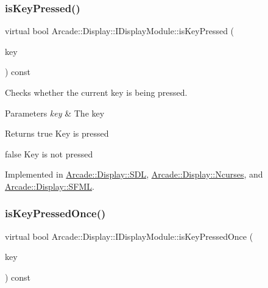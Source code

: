 \subsubsection{\texorpdfstring{isKeyPressed()}{isKeyPressed()}}
{\footnotesize\ttfamily virtual bool Arcade\+::\+Display\+::\+I\+Display\+Module\+::is\+Key\+Pressed (\begin{DoxyParamCaption}\item[{\mbox{\hyperlink{classArcade_1_1Display_1_1IDisplayModule_a8da3f6b309ca0581473ae8cc8789b619}{I\+Display\+Module\+::\+Keys}}}]{key }\end{DoxyParamCaption}) const\hspace{0.3cm}{\ttfamily [pure virtual]}}



Checks whether the current key is being pressed. 


\begin{DoxyParams}{Parameters}
{\em key} & The key \\
\hline
\end{DoxyParams}
\begin{DoxyReturn}{Returns}
true Key is pressed 

false Key is not pressed 
\end{DoxyReturn}


Implemented in \mbox{\hyperlink{classArcade_1_1Display_1_1SDL_ab7a692d8968af7633a92042ee006b83a}{Arcade\+::\+Display\+::\+S\+DL}}, \mbox{\hyperlink{classArcade_1_1Display_1_1Ncurses_a10f2b5576e60581c43719ab2ea882d93}{Arcade\+::\+Display\+::\+Ncurses}}, and \mbox{\hyperlink{classArcade_1_1Display_1_1SFML_ad33097d101e94bbb65ea4eed560e03c4}{Arcade\+::\+Display\+::\+S\+F\+ML}}.

\mbox{\label{classArcade_1_1Display_1_1IDisplayModule_a531b700b332e077d9b714bafac05ebe1}} 
\subsubsection{\texorpdfstring{isKeyPressedOnce()}{isKeyPressedOnce()}}
{\footnotesize\ttfamily virtual bool Arcade\+::\+Display\+::\+I\+Display\+Module\+::is\+Key\+Pressed\+Once (\begin{DoxyParamCaption}\item[{\mbox{\hyperlink{classArcade_1_1Display_1_1IDisplayModule_a8da3f6b309ca0581473ae8cc8789b619}{I\+Display\+Module\+::\+Keys}}}]{key }\end{DoxyParamCaption}) const\hspace{0.3cm}{\ttfamily [pure virtual]}}



